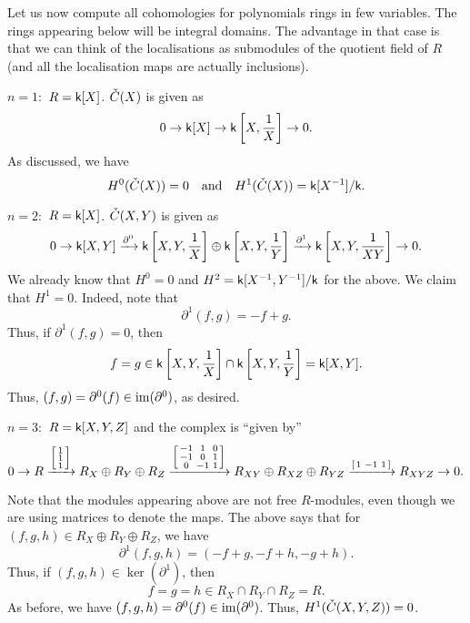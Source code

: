 \begin{ex}
	Let us now compute all cohomologies for polynomials rings in few variables. The rings appearing below will be integral domains. The advantage in that case is that we can think of the localisations as submodules of the quotient field of $R$ (and all the localisation maps are actually inclusions).

	$n = 1:$ $R = \mathsf{k}[X]$. $\check{C}(X)$ is given as
	\begin{equation*} 
		0 \to \mathsf{k}[X] \to \mathsf{k}\left[X, \frac{1}{X}\right] \to 0.
	\end{equation*}
	As discussed, we have
	\begin{equation*} 
		H^{0}(\check{C}(X)) = 0 \quad\text{and}\quad H^{1}(\check{C}(X)) = \mathsf{k}[X^{-1}]/\mathsf{k}.
	\end{equation*}
	
	\hrulefill

	$n = 2:$ $R = \mathsf{k}[X]$. $\check{C}(X, Y)$ is given as
	\begin{equation*} 
		0 \to \mathsf{k}[X, Y] \xrightarrow{\partial^{0}} \mathsf{k}\left[X, Y, \frac{1}{X}\right] \oplus \mathsf{k}\left[X, Y, \frac{1}{Y}\right] \xrightarrow{\partial^{1}} \mathsf{k}\left[X, Y, \frac{1}{XY}\right] \to 0.
	\end{equation*}
	We already know that $H^{0} = 0$ and $H^{2} = \mathsf{k}[X^{-1}, Y^{-1}]/\mathsf{k}$ for the above. We claim that $H^{1} = 0$. Indeed, note that
	\begin{equation*} 
		\partial^{1}(f, g) = -f + g.
	\end{equation*}
	Thus, if $\partial^{1}(f, g) = 0$, then 
	\begin{equation*} 
		f = g \in \mathsf{k}\left[X, Y, \frac{1}{X}\right] \cap \mathsf{k}\left[X, Y, \frac{1}{Y}\right] = \mathsf{k}[X, Y].
	\end{equation*}
	Thus, $(f, g) = \partial^{0}(f) \in \operatorname{im}(\partial^{0})$, as desired.
	
	\hrulefill
	
	$n = 3:$ $R = \mathsf{k}[X, Y, Z]$ and the complex is ``given by''
	\begin{equation*} 
		0 \to R \xrightarrow{\left[\begin{smallmatrix} 1 \\ 1 \\ 1 \end{smallmatrix}\right]} R_{X} \oplus R_{Y} \oplus R_{Z} 
		\xrightarrow{\left[\begin{smallmatrix} -1 & 1 & 0 \\
							  -1 & 0 & 1 \\
							  0 & -1 & 1 \end{smallmatrix}\right]} 
		R_{XY} \oplus R_{XZ} \oplus R_{YZ} \xrightarrow{\left[\begin{smallmatrix} 1 & -1 & 1 \end{smallmatrix}\right]} R_{XYZ} \to 0.
	\end{equation*}

	Note that the modules appearing above are not free $R$-modules, even though we are using matrices to denote the maps. The above says that for $(f, g, h) \in R_{X} \oplus R_{Y} \oplus R_{Z}$, we have
	\begin{equation*} 
		\partial^{1}(f, g, h) = (-f + g, -f + h, -g + h).
	\end{equation*}
	Thus, if $(f, g, h) \in \ker(\partial^{1})$, then
	\begin{equation*} 
		f = g = h \in R_{X} \cap R_{Y} \cap R_{Z} = R.
	\end{equation*}
	As before, we have $(f, g, h) = \partial^{0}(f) \in \operatorname{im}(\partial^{0})$. Thus, $H^{1}(\check{C}(X, Y, Z)) = 0$.


\end{ex}
